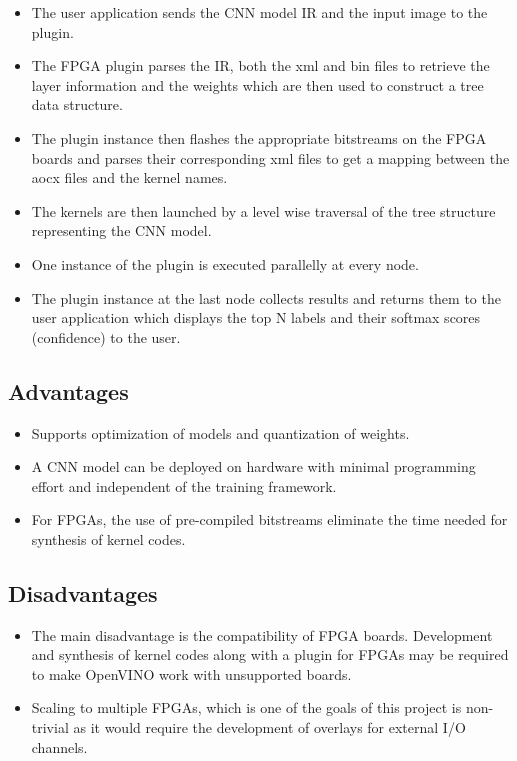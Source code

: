  \begin{itemize}
     \item The user application sends the CNN model IR and the input image to the plugin.
     \item The FPGA plugin parses the IR, both the xml and bin files to retrieve the layer information and the weights which are then used to construct a tree data structure.
     \item The plugin instance then flashes the appropriate bitstreams on the FPGA boards and parses their corresponding xml files to get a mapping between the aocx files and the kernel names.
     \item The kernels are then launched by a level wise traversal of the tree structure representing the CNN model.
     \item One instance of the plugin is executed parallelly at every node.
     \item The plugin instance at the last node collects results and returns them to the user application which displays the top N labels and their softmax scores (confidence) to the user.
 \end{itemize}
 
 \subsection{Advantages}
  
 \begin{itemize}
 \item Supports optimization of models and quantization of weights.
 \item A CNN model can be deployed on hardware with minimal programming effort and independent of the training framework.
 \item For FPGAs, the use of pre-compiled bitstreams eliminate the time needed for synthesis of kernel codes.
 \end{itemize}
 
 \subsection{Disadvantages}
 \begin{itemize}
 \item The main disadvantage is the compatibility of FPGA boards. Development and synthesis of kernel codes along with a plugin for FPGAs may be required to make OpenVINO work with unsupported boards. 
 \item Scaling to multiple FPGAs, which is one of the goals of this project is non-trivial as it would require the development of overlays for external I/O channels. 
 \end{itemize}
